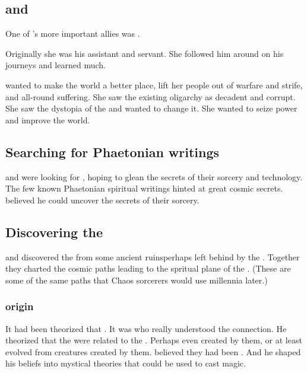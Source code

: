\subsection[Sethicus and Tyrasshana]{\Sethicus and \Tiamat}
One of \Sethicus's more important allies was . 

Originally she was his assistant and servant.
She followed him around on his journeys and learned much. 

\Tiamat wanted to make the world a better place, lift her people out of warfare and strife,  and all-round suffering.
She saw the existing \ophidian oligarchy as decadent and corrupt. 
She saw the dystopia of the  and wanted to change it.
She wanted to seize power and improve the world. 









\subsection{Searching for Phaetonian writings}
\Sethicus and \Tiamat were looking for , hoping to glean the secrets of their sorcery and technology. 
The few known Phaetonian spiritual writings hinted at great cosmic secrets.
\Sethicus believed he could uncover the secrets of their sorcery.










\subsection{Discovering the \xss}
\Sethicus and \Tiamat discovered the \xss{} from some ancient ruins\dash perhaps left behind by the \voyagers. 
Together they charted the cosmic paths leading to the spritual plane of the \xzaishann. 
(These are some of the same paths that Chaos sorcerers would use millennia later.)





\subsubsection{\Ophidian origin}
It had been theorized that . 
It was \Sethicus who really understood the connection. 
He theorized that the \ophidians were related to the \xss.
Perhaps even created by them, or at least evolved from creatures created by them.
\Sethicus believed they had been . 
And he shaped his beliefs into mystical theories that could be used to cast magic. 


